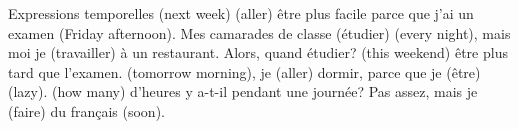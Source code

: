 \documentclass{beamer}
\begin{document}
  \begin{frame}{Expressions temporelles}
    \underline{} (next week) \underline{} (aller) être plus facile parce que j'ai un examen \underline{} (Friday afternoon).
    Mes camarades de classe \underline{} (étudier) \underline{} (every night), mais moi je \underline{} (travailler) à un restaurant.
    Alors, quand étudier?
    \underline{} (this weekend) \underline{} être plus tard que l'examen.
    \underline{} (tomorrow morning), je \underline{} (aller) dormir, parce que je \underline{} (être) \underline{} (lazy).
    \underline{} (how many) d'heures y a-t-il pendant une journée?
    Pas assez, mais je \underline{} (faire) du français \underline{} (soon).
  \end{frame}
\end{document}
